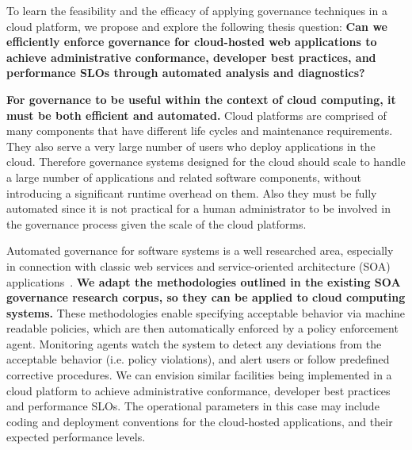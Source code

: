 To learn the feasibility and the efficacy of applying governance
techniques in a cloud platform, we propose and explore the following thesis
question:
{\bf Can we efficiently enforce governance for cloud-hosted web applications to achieve 
administrative conformance, developer best practices, and performance SLOs through 
automated analysis and diagnostics?} 

\textbf{For governance to be
useful within the context of cloud computing, it must be both efficient and automated.}
Cloud platforms are comprised of many components that have different life cycles
and maintenance requirements. 
They also serve a very large number of users who deploy applications in
the cloud. Therefore governance systems designed for the cloud should scale to handle a 
large number of applications and related software components,
without introducing a significant runtime overhead on them.
Also they must be fully automated since it is not practical for a human administrator to be
involved in the governance process given the scale of the cloud platforms.

Automated governance for software systems is a well researched area,
especially in connection with classic web services and service-oriented architecture 
(SOA) applications~\cite{gartner-soa-gov,soagov,Schepers:2008:LAS:1363686.1363932,5577268,4730489}. 
\textbf{We adapt the methodologies outlined in the existing SOA governance research corpus, so
they can be applied to cloud computing systems.}
These methodologies enable specifying
acceptable behavior via machine readable policies, which are then automatically enforced by
a policy enforcement agent. Monitoring agents watch the system to detect any deviations from
the acceptable behavior (i.e. policy violations), and alert users or follow predefined corrective
procedures. We can envision similar facilities being implemented in a cloud platform to 
achieve administrative conformance, developer best practices and performance SLOs. The operational
parameters in this case may include coding and deployment conventions for the cloud-hosted
applications, and their expected performance levels.

